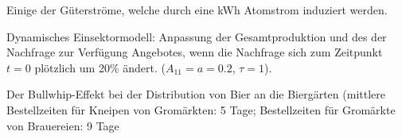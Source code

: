 \documentclass[a4paper]{foils}
\begin{document}
\begin{landscape}
\begin{center}


\vspace{2em}


\newpage
\vspace{1em}
Einige der G\"uterstr\"ome, welche durch eine kWh Atomstrom induziert werden.
\newpage
\vspace{1em}
\parbox{1.2\textwidth}{Dynamisches Einsektormodell: Anpassung der
Gesamtproduktion und des der Nachfrage zur Verf\"ugung
Angebotes, wenn die Nachfrage sich zum Zeitpunkt $t=0$ pl\"otzlich um
20\% \"andert. ($A_{11}=a=0.2$, $\tau=1$).}

\newpage
\vspace{1em}
\parbox{1.1\textwidth}{Der Bullwhip-Effekt bei der Distribution von Bier
  an die Bierg\"arten (mittlere Bestellzeiten f\"ur Kneipen von Gro\3m\"arkten: 5 Tage;
  Bestellzeiten f\"ur Gro\3m\"arkte von Brauereien: 9 Tage}

\newpage
\bfsf{}
\vspace{1em}


\end{center}
\end{landscape}
\end{document}
